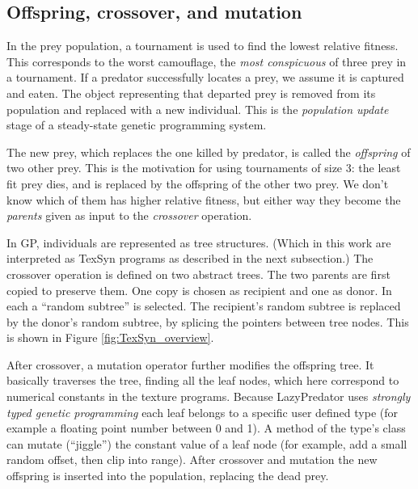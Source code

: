 \documentclass[acmtog]{acmart}
\newcommand{\jargon}[1]{\textit{#1}}
\begin{document}

\subsection{Offspring, crossover, and mutation}
In the prey population, a tournament is used to find the lowest relative fitness. This corresponds to the worst camouflage, the \jargon{most conspicuous} of three prey in a tournament. If a predator successfully locates a prey, we assume it is captured and eaten. The object representing that departed prey is removed from its population and replaced with a new individual. This is the \jargon{population update} stage of a steady-state genetic programming system.
\par
The new prey, which replaces the one killed by predator, is called the \jargon{offspring} of two other prey. This is the motivation for using tournaments of size 3: the least fit prey dies, and is replaced by the offspring of the other two prey. We don't know which of them has higher relative fitness, but either way they become the \jargon{parents} given as input to the \jargon{crossover} operation.
\par
In GP, individuals are represented as tree structures. (Which in this work are interpreted as TexSyn programs as described in the next subsection.) The crossover operation is defined on two abstract trees. The two parents are first copied to preserve them. One copy is chosen as recipient and one as donor. In each a “random subtree” is selected. The recipient's random subtree is replaced by the donor's random subtree, by splicing the pointers between tree nodes. This is shown in Figure \ref{fig:TexSyn_overview}.
\par
After crossover, a mutation operator further modifies the offspring tree. It basically traverses the tree, finding all the leaf nodes, which here correspond to numerical constants in the texture programs. Because LazyPredator uses \jargon{strongly typed genetic programming} \cite{montana_strongly_1995} each leaf belongs to a specific user defined type (for example a floating point number between 0 and 1). A method of the type's class can mutate (“jiggle”) the constant value of a leaf node (for example, add a small random offset, then clip into range). After crossover and mutation the new offspring is inserted into the population, replacing the dead prey.
\par

\end{document}
